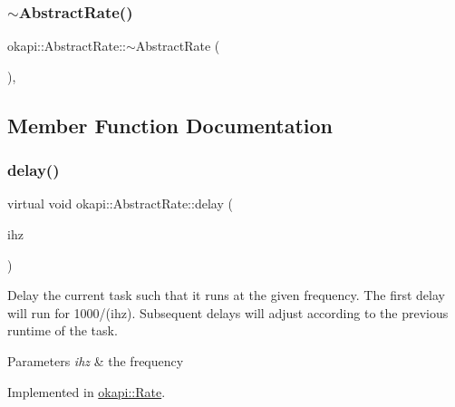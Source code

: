 \subsubsection{\texorpdfstring{$\sim$AbstractRate()}{~AbstractRate()}}
{\footnotesize\ttfamily okapi\+::\+Abstract\+Rate\+::$\sim$\+Abstract\+Rate (\begin{DoxyParamCaption}{ }\end{DoxyParamCaption})\hspace{0.3cm}{\ttfamily [virtual]}, {\ttfamily [default]}}



\subsection{Member Function Documentation}
\mbox{\label{classokapi_1_1AbstractRate_ab1abf71d6cf3184abeed1d3556d39d4f}} 
\subsubsection{\texorpdfstring{delay()}{delay()}\hspace{0.1cm}{\footnotesize\ttfamily [1/2]}}
{\footnotesize\ttfamily virtual void okapi\+::\+Abstract\+Rate\+::delay (\begin{DoxyParamCaption}\item[{Q\+Frequency}]{ihz }\end{DoxyParamCaption})\hspace{0.3cm}{\ttfamily [pure virtual]}}

Delay the current task such that it runs at the given frequency. The first delay will run for 1000/(ihz). Subsequent delays will adjust according to the previous runtime of the task.


\begin{DoxyParams}{Parameters}
{\em ihz} & the frequency \\
\hline
\end{DoxyParams}


Implemented in \mbox{\hyperlink{classokapi_1_1Rate_ad066b6b32b6d43f4ccbb66617018e1fc}{okapi\+::\+Rate}}.

\mbox{\label{classokapi_1_1AbstractRate_a89a4325d3fc4739abc085813095d659a}} 
